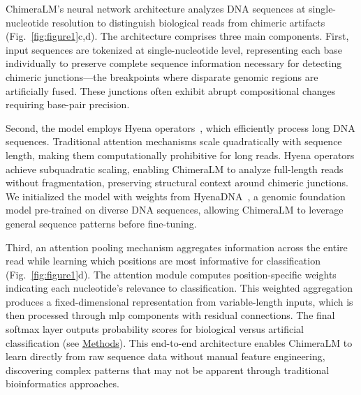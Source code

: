 \documentclass[pdflatex,sn-nature,lineno]{sn-jnl}%
\theoremstyle{thmstyleone}%
\theoremstyle{thmstyletwo}%
\theoremstyle{thmstylethree}%
\begin{document}
ChimeraLM's neural network architecture analyzes DNA sequences at single-nucleotide resolution to distinguish biological reads from chimeric artifacts (Fig.~\ref{fig:figure1}c,d).
The architecture comprises three main components.
First, input sequences are tokenized at single-nucleotide level, representing each base individually to preserve complete sequence information necessary for detecting chimeric junctions—the breakpoints where disparate genomic regions are artificially fused.
These junctions often exhibit abrupt compositional changes requiring base-pair precision.

Second, the model employs Hyena operators~\cite{Poli2023HyenaHT}, which efficiently process long DNA sequences.
Traditional attention mechanisms scale quadratically with sequence length, making them computationally prohibitive for long reads.
Hyena operators achieve subquadratic scaling, enabling ChimeraLM to analyze full-length reads without fragmentation, preserving structural context around chimeric junctions.
We initialized the model with weights from HyenaDNA~\cite{nguyen2023hyenadna}, a genomic foundation model pre-trained on diverse DNA sequences, allowing ChimeraLM to leverage general sequence patterns before fine-tuning.

Third, an attention pooling mechanism aggregates information across the entire read while learning which positions are most informative for classification (Fig.~\ref{fig:figure1}d).
The attention module computes position-specific weights indicating each nucleotide's relevance to classification.
This weighted aggregation produces a fixed-dimensional representation from variable-length inputs, which is then processed through \gls{mlp} components with residual connections.
The final softmax layer outputs probability scores for biological versus artificial classification (see \hyperref[sec:methods]{Methods}).
This end-to-end architecture enables ChimeraLM to learn directly from raw sequence data without manual feature engineering, discovering complex patterns that may not be apparent through traditional bioinformatics approaches.
\end{document}
